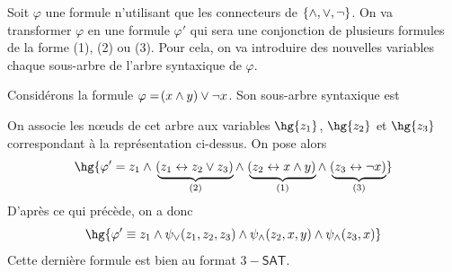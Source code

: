 \documentclass[a4paper,french,bookmarks]{book}
\newcommand{\SAT}{\textsf{SAT}}
\begin{document}
    Soit $\varphi$ une formule n'utilisant que les connecteurs de $\left\{\land, \lor, \neg\right\}$. On va transformer $\varphi$ en une formule $\varphi'$ qui sera une conjonction de plusieurs formules de la forme (1), (2) ou (3). Pour cela, on va introduire des nouvelles variables chaque sous-arbre de l'arbre syntaxique de $\varphi$.
    
    \begin{example}{}{}
        Considérons la formule $\varphi = \!\left(x \land y\right) \lor \neg x$. Son sous-arbre syntaxique est
        \begin{center}
        \end{center}
        On associe les n\oe{}uds de cet arbre aux variables $\hg{z_1}$, $\hg{z_2}$ et $\hg{z_3}$ correspondant à la représentation ci-dessus. On pose alors
        \[ \hg{\varphi' = z_1 \land\; \underbrace{\p{z_1 \leftrightarrow z_2 \lor z_3}}_{(2)} \land\; \underbrace{\p{z_2 \leftrightarrow x \land y}}_{(1)} \land\; \underbrace{\p{z_3 \leftrightarrow \neg x}}_{(3)}}\]
        D'après ce qui précède, on a donc
        \[ \hg{\varphi' \equiv z_1 \land \psi_\lor\p{z_1, z_2, z_3} \land \psi_\land\p{z_2, x, y} \land \psi_\land\p{z_3, x}} \]
        Cette dernière formule est bien au format $3-\SAT$.
    \end{example}
    
\end{document}
